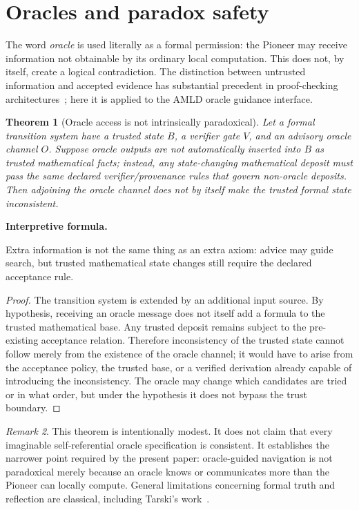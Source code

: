 \documentclass[11pt]{article}
\newtheorem{theorem}{Theorem}[section]
\theoremstyle{definition}
\theoremstyle{remark}
\newtheorem{remark}[theorem]{Remark}
\newenvironment{interpretiveformula}{%
  \begin{center}\begin{minipage}{0.92\linewidth}\small
  \textbf{Interpretive formula.}\ \raggedright}{\end{minipage}\end{center}}
\begin{document}
\section{Oracles and paradox safety}
The word \emph{oracle} is used literally as a formal permission: the Pioneer may receive information not obtainable by its ordinary local computation. This does not, by itself, create a logical contradiction. The distinction between untrusted information and accepted evidence has substantial precedent in proof-checking architectures~\cite{necula}; here it is applied to the AMLD oracle guidance interface.

\begin{theorem}[Oracle access is not intrinsically paradoxical]
Let a formal transition system have a trusted state $B$, a verifier gate $V$, and an advisory oracle channel $O$. Suppose oracle outputs are not automatically inserted into $B$ as trusted mathematical facts; instead, any state-changing mathematical deposit must pass the same declared verifier/provenance rules that govern non-oracle deposits. Then adjoining the oracle channel does not \emph{by itself} make the trusted formal state inconsistent.
\end{theorem}
\begin{interpretiveformula}
Extra information is not the same thing as an extra axiom: advice may guide search, but trusted mathematical state changes still require the declared acceptance rule.
\end{interpretiveformula}
\begin{proof}
The transition system is extended by an additional input source. By hypothesis, receiving an oracle message does not itself add a formula to the trusted mathematical base. Any trusted deposit remains subject to the pre-existing acceptance relation. Therefore inconsistency of the trusted state cannot follow merely from the existence of the oracle channel; it would have to arise from the acceptance policy, the trusted base, or a verified derivation already capable of introducing the inconsistency. The oracle may change which candidates are tried or in what order, but under the hypothesis it does not bypass the trust boundary.
\end{proof}
\begin{remark}
This theorem is intentionally modest. It does not claim that every imaginable self-referential oracle specification is consistent. It establishes the narrower point required by the present paper: oracle-guided navigation is not paradoxical merely because an oracle knows or communicates more than the Pioneer can locally compute. General limitations concerning formal truth and reflection are classical, including Tarski's work~\cite{tarski}.
\end{remark}
\end{document}
